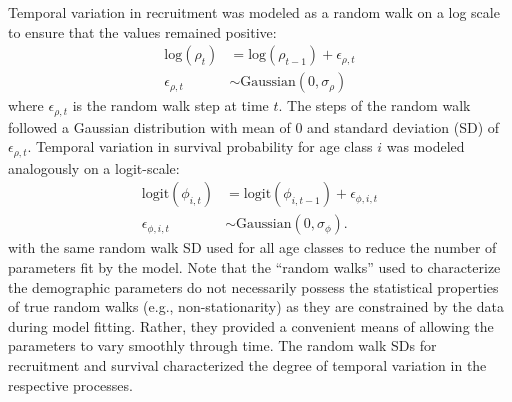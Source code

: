 Temporal variation in recruitment was modeled as a random walk on a log scale to ensure
that the values remained positive:
%
\begin{equation} \label{eq:rho}
\begin{aligned}
\text{log}\left(\rho_t\right) &= \text{log}\left(\rho_{t - 1}\right) + \epsilon_{\rho,t} \\
\epsilon_{\rho,t} &\sim \text{Gaussian}\left(0, \sigma_{\rho} \right)
\end{aligned}
\end{equation}
%
where $\epsilon_{\rho,t}$ is the random walk step at time $t$.
The steps of the random walk followed a Gaussian distribution with mean of 0 
and standard deviation (SD) of $\epsilon_{\rho,t}$.
Temporal variation in survival probability for age class $i$ was modeled analogously 
on a logit-scale:
%
\begin{equation} \label{eq:phi}
\begin{aligned}
\text{logit}\left(\phi_{i, t}\right) &= \text{logit}\left(\phi_{i, t - 1}\right) +
                                          \epsilon_{\phi,i,t} \\
\epsilon_{\phi,i,t} &\sim \text{Gaussian}\left(0, \sigma_{\phi} \right)\text{.}
\end{aligned}
\end{equation}
%
with the same random walk SD used for all age classes 
to reduce the number of parameters fit by the model.
Note that the ``random walks'' used to characterize the demographic parameters 
do not necessarily possess the statistical properties 
of true random walks (e.g., non-stationarity) 
as they are constrained by the data during model fitting.
Rather, they provided a convenient means 
of allowing the parameters to vary smoothly through time.
The random walk SDs for recruitment and survival 
characterized the degree of temporal variation in the respective processes. 

